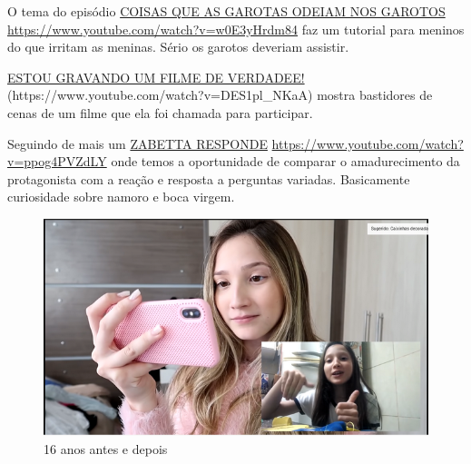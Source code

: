 O tema do episódio \href{https://www.youtube.com/watch?v=w0E3yHrdm84}{COISAS QUE AS GAROTAS ODEIAM NOS GAROTOS} \url{https://www.youtube.com/watch?v=w0E3yHrdm84} faz um tutorial para meninos do que irritam as meninas. Sério os garotos deveriam assistir.

\href{https://www.youtube.com/watch?v=DES1pl_NKaA}{ESTOU GRAVANDO UM FILME DE VERDADEE!} (https://www.youtube.com/watch?v=DES1pl_NKaA) mostra bastidores de cenas de um filme que ela foi chamada para participar.

Seguindo de mais um \href{https://www.youtube.com/watch?v=ppog4PVZdLY}{ZABETTA RESPONDE} \url{https://www.youtube.com/watch?v=ppog4PVZdLY} onde temos a oportunidade de comparar o amadurecimento da protagonista com a reação e resposta a perguntas variadas. Basicamente curiosidade sobre namoro e boca virgem.

\begin{figure}[h!]
    \centering
    \includegraphics[width=0.7\linewidth]{fig/Zabetta-16-anos3-antes-depois}
    \caption{16 anos antes e depois}
    \label{fig:zabetta-16-anos3-antes-depois}
\end{figure}



